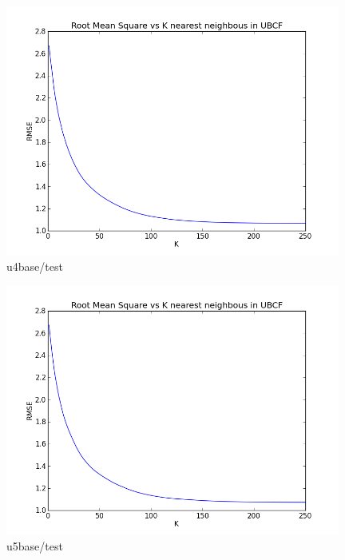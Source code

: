 \documentclass{article}
\begin{document}
\begin{figure}[h!tb]
\centering
\includegraphics[width=11cm]{9.png}
\caption {u4base/test}
\end{figure}
\begin{figure}[h!tb]
\centering
\includegraphics[width=11cm]{10.png}
\caption {u5base/test}
\end{figure}
\newpage
\end{document}
